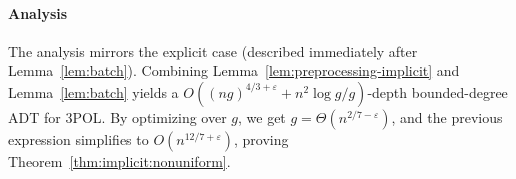 \paragraph{Analysis}
The analysis mirrors the explicit case (described immediately after
Lemma~\ref{lem:batch}). Combining Lemma~\ref{lem:preprocessing-implicit} and
Lemma~\ref{lem:batch} yields a $O( {(ng)}^{4/3+\varepsilon} + n^2 \log g /
g)$-depth bounded-degree ADT for 3POL\@. By optimizing over $g$, we get $g =
\Theta(n^{2/7-\varepsilon})$, and the previous expression simplifies to
$O(n^{12/7+\varepsilon})$, proving Theorem~\ref{thm:implicit:nonuniform}.
